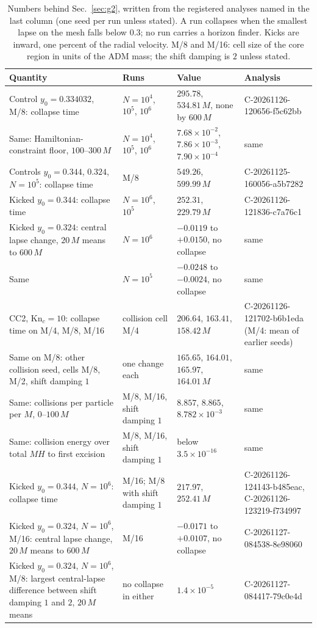 \documentclass[aps,prd,twocolumn,10pt,superscriptaddress,nofootinbib,longbibliography,floatfix]{revtex4-2}
\newcommand{\Kn}{\mathrm{Kn}}
\begin{document}


\begin{table}
\caption{Numbers behind Sec.~\ref{sec:g2}, written from the registered analyses named in the last column (one seed per run unless stated). A run collapses when the smallest lapse on the mesh falls below $0.3$; no run carries a horizon finder. Kicks are inward, one percent of the radial velocity. M/8 and M/16: cell size of the core region in units of the ADM mass; the shift damping is $2$ unless stated.}
\label{tab:ledgerG2}
\footnotesize
\begin{ruledtabular}
\begin{tabular}{p{5.6cm}p{3.0cm}p{3.9cm}p{4.2cm}}
Quantity & Runs & Value & Analysis \\
\hline
Control $y_0=0.334032$, M/8: collapse time & $N=10^4$, $10^5$, $10^6$ & $295.78$, $534.81\,M$, none by $600\,M$ & C-20261126-120656-f5c62bb \\
Same: Hamiltonian-constraint floor, $100$--$300\,M$ & $N=10^4$, $10^5$, $10^6$ & $7.68\times10^{-2}$, $7.86\times10^{-3}$, $7.90\times10^{-4}$ & same \\
Controls $y_0=0.344$, $0.324$, $N=10^5$: collapse time & M/8 & $549.26$, $599.99\,M$ & C-20261125-160056-a5b7282 \\
Kicked $y_0=0.344$: collapse time & $N=10^6$, $10^5$ & $252.31$, $229.79\,M$ & C-20261126-121836-c7a76c1 \\
Kicked $y_0=0.324$: central lapse change, $20\,M$ means to $600\,M$ & $N=10^6$ & $-0.0119$ to $+0.0150$, no collapse & same \\
Same & $N=10^5$ & $-0.0248$ to $-0.0024$, no collapse & same \\
CC2, $\Kn_c=10$: collapse time on M/4, M/8, M/16 & collision cell M/4 & $206.64$, $163.41$, $158.42\,M$ & C-20261126-121702-b6b1eda (M/4: mean of earlier seeds) \\
Same on M/8: other collision seed, cells M/8, M/2, shift damping $1$ & one change each & $165.65$, $164.01$, $165.97$, $164.01\,M$ & same \\
Same: collisions per particle per $M$, $0$--$100\,M$ & M/8, M/16, shift damping $1$ & $8.857$, $8.865$, $8.782\times10^{-3}$ & same \\
Same: collision energy over total $MH$ to first excision & M/8, M/16, shift damping $1$ & below $3.5\times10^{-16}$ & same \\
Kicked $y_0=0.344$, $N=10^6$: collapse time & M/16; M/8 with shift damping $1$ & $217.97$, $252.41\,M$ & C-20261126-124143-b485eac, C-20261126-123219-f734997 \\
Kicked $y_0=0.324$, $N=10^6$, M/16: central lapse change, $20\,M$ means to $600\,M$ & M/16 & $-0.0171$ to $+0.0107$, no collapse & C-20261127-084538-8e98060 \\
Kicked $y_0=0.324$, $N=10^6$, M/8: largest central-lapse difference between shift damping $1$ and $2$, $20\,M$ means & no collapse in either & $1.4\times10^{-5}$ & C-20261127-084417-79c0e4d \\
\end{tabular}
\end{ruledtabular}
\end{table}
\end{document}
